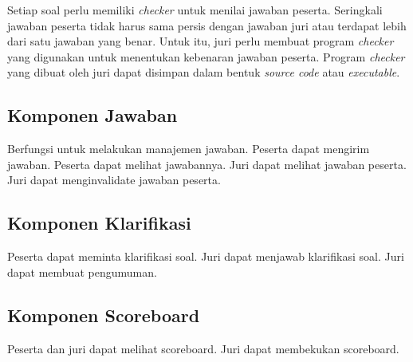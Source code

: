 \par Setiap soal perlu memiliki \textit{checker} untuk menilai jawaban peserta. Seringkali jawaban peserta tidak harus sama persis dengan jawaban juri atau terdapat lebih dari satu jawaban yang benar. Untuk itu, juri perlu membuat program \textit{checker} yang digunakan untuk menentukan kebenaran jawaban peserta. Program \textit{checker} yang dibuat oleh juri dapat disimpan dalam bentuk \textit{source code} atau \textit{executable}.

\subsection{Komponen Jawaban}

\par Berfungsi untuk melakukan manajemen jawaban. Peserta dapat mengirim jawaban. Peserta dapat melihat jawabannya. Juri dapat melihat jawaban peserta. Juri dapat menginvalidate jawaban peserta.

\subsection{Komponen Klarifikasi}

\par Peserta dapat meminta klarifikasi soal. Juri dapat menjawab klarifikasi soal. Juri dapat membuat pengumuman.

\subsection{Komponen Scoreboard}

\par Peserta dan juri dapat melihat scoreboard. Juri dapat membekukan scoreboard.
